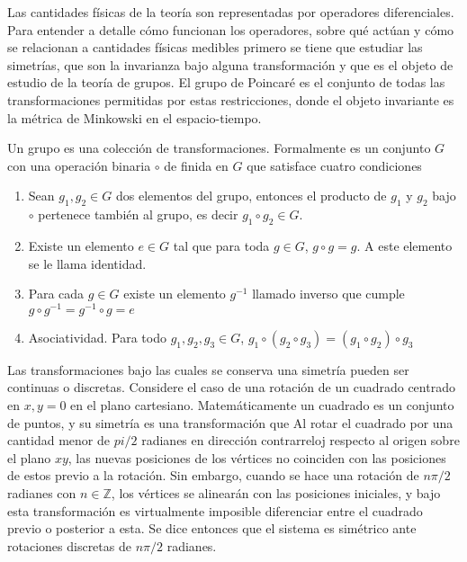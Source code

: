 Las cantidades físicas de la teoría son representadas por operadores diferenciales. Para entender a detalle cómo funcionan los operadores, sobre qué actúan y cómo se relacionan a cantidades físicas medibles primero se tiene que estudiar las simetrías, que son la invarianza bajo alguna transformación y que es el objeto de estudio de la teoría de grupos. El grupo de Poincaré es el conjunto de todas las transformaciones permitidas por estas restricciones, donde el objeto invariante es la métrica de Minkowski en el espacio-tiempo.

Un grupo es una colección de transformaciones. Formalmente es un conjunto $G$ con una operación binaria $\circ$ de finida en $G$ que satisface cuatro condiciones
\begin{enumerate}
  \item Sean $g_1,g_2 \in G$ dos elementos del grupo, entonces el producto de $g_1$ y $g_2$ bajo $\circ$ pertenece también al grupo, es decir $g_1 \circ g_2 \in G$.
  \item Existe un elemento $e\in G$ tal que para toda $g\in G$, $g\circ g = g$. A este elemento se le llama identidad.
  \item Para cada $g\in G$ existe un elemento $g^{-1}$ llamado inverso que cumple $g\circ g^{-1} = g^{-1}\circ g =e$
  \item Asociatividad. Para todo $g_1, g_2, g_3 \in G$, $g_1 \circ (g_2 \circ g_3) = (g_1 \circ g_2) \circ g_3$
\end{enumerate}

Las transformaciones bajo las cuales se conserva una simetría pueden ser continuas o discretas. Considere el caso de una rotación de un cuadrado centrado en $x,y=0$ en el plano cartesiano. Matemáticamente un cuadrado es un conjunto de puntos, y su simetría es una transformación que  Al rotar el cuadrado por una cantidad menor de $pi/2$ radianes en dirección contrarreloj respecto al origen sobre el plano $xy$, las nuevas posiciones de los vértices no coinciden con las posiciones de estos previo a la rotación. Sin embargo, cuando se hace una rotación de $n\pi/2$ radianes con $n\in \mathbb{Z}$, los vértices se alinearán con las posiciones iniciales, y bajo esta transformación es virtualmente imposible diferenciar entre el cuadrado previo o posterior a esta. Se dice entonces que el sistema es simétrico ante rotaciones discretas de $n\pi/2$ radianes.


